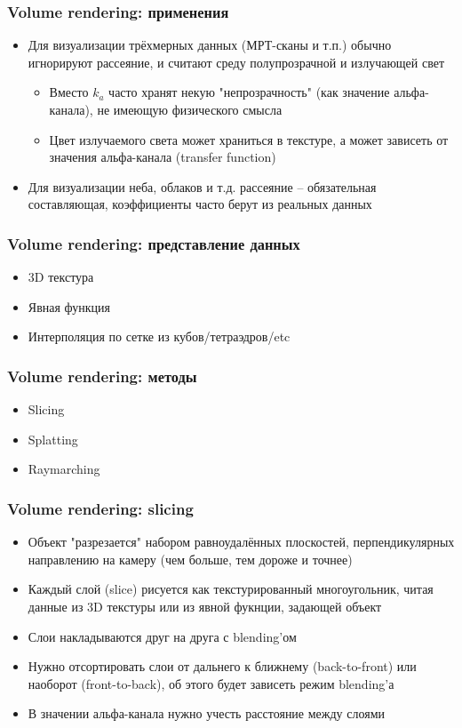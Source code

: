 \documentclass{beamer}
\begin{document}
\begin{frame}[fragile]
\frametitle{Volume rendering: применения}
\begin{itemize}
\item Для визуализации трёхмерных данных (МРТ-сканы и т.п.) обычно игнорируют рассеяние, и считают среду полупрозрачной и излучающей свет
\pause
\begin{itemize}
\item Вместо \begin{math}k_a\end{math} часто хранят некую "непрозрачность" (как значение альфа-канала), не имеющую физического смысла
\pause
\item Цвет излучаемого света может храниться в текстуре, а может зависеть от значения альфа-канала (transfer function)
\end{itemize}
\pause
\item Для визуализации неба, облаков и т.д. рассеяние -- обязательная составляющая, коэффициенты часто берут из реальных данных
\end{itemize}
\end{frame}

\begin{frame}[fragile]
\frametitle{Volume rendering: представление данных}
\begin{itemize}
\item 3D текстура
\pause
\item Явная функция
\pause
\item Интерполяция по сетке из кубов/тетраэдров/etc
\end{itemize}
\end{frame}

\begin{frame}[fragile]
\frametitle{Volume rendering: методы}
\begin{itemize}
\item Slicing
\item Splatting
\item Raymarching
\end{itemize}
\end{frame}

\begin{frame}[fragile]
\frametitle{Volume rendering: slicing}
\begin{itemize}
\item Объект "разрезается" набором равноудалённых плоскостей, перпендикулярных направлению на камеру (чем больше, тем дороже и точнее)
\pause
\item Каждый слой (slice) рисуется как текстурированный многоугольник, читая данные из 3D текстуры или из явной фукнции, задающей объект
\pause
\item Слои накладываются друг на друга с blending'ом
\pause
\item Нужно отсортировать слои от дальнего к ближнему (back-to-front) или наоборот (front-to-back), об этого будет зависеть режим blending'а
\pause
\item В значении альфа-канала нужно учесть расстояние между слоями
\end{itemize}
\end{frame}
\end{document}
